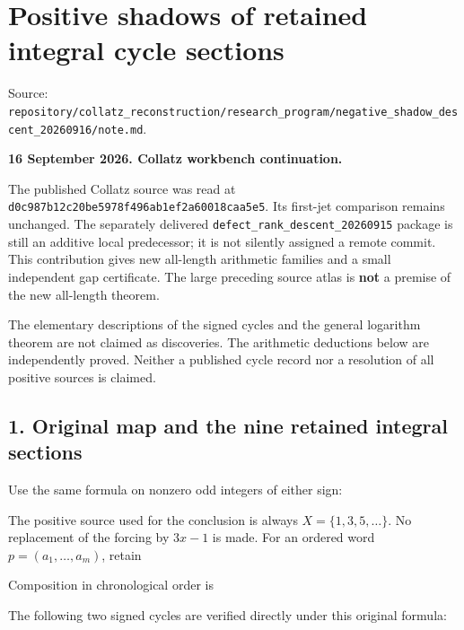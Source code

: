 \chapter{Positive shadows of retained integral cycle sections}
{\small\sffamily Source: \nolinkurl{repository/collatz_reconstruction/research_program/negative_shadow_descent_20260916/note.md}.\par}


\textbf{16 September 2026. Collatz workbench continuation.}

The published Collatz source was read at
\nolinkurl{d0c987b12c20be5978f496ab1ef2a60018caa5e5}. Its first-jet
comparison remains unchanged. The separately delivered
\nolinkurl{defect_rank_descent_20260915} package is still an additive
local predecessor; it is not silently assigned a remote commit. This
contribution gives new all-length arithmetic families and a small
independent gap certificate. The large preceding source atlas is
\textbf{not} a premise of the new all-length theorem.

The elementary descriptions of the signed cycles and the general
logarithm theorem are not claimed as discoveries. The arithmetic
deductions below are independently proved. Neither a published cycle
record nor a resolution of all positive sources is claimed.

\section{1. Original map and the nine retained integral sections}

Use the same formula on nonzero odd integers of either sign:


The positive source used for the conclusion is always
\(X=\{1,3,5,\ldots\}\). No replacement of the forcing by \(3x-1\) is
made. For an ordered word \(p=(a_1,\ldots,a_m)\), retain


Composition in chronological order is


The following two signed cycles are verified directly under this
original formula:



